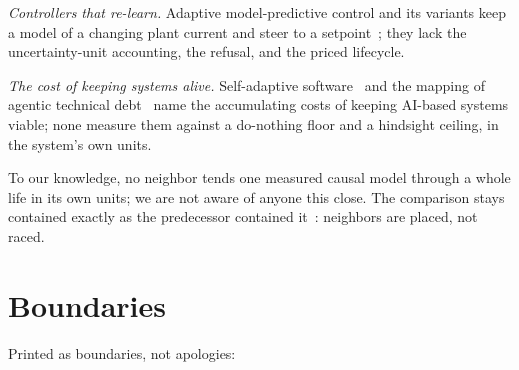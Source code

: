 \documentclass[11pt,a4paper]{article}
\begin{document}
\emph{Controllers that re-learn.} Adaptive model-predictive control
and its variants keep a model of a changing plant current and steer
to a setpoint~\cite{tanaskovic2017,knaup2024}; they lack the
uncertainty-unit accounting, the refusal, and the priced lifecycle.

\emph{The cost of keeping systems alive.} Self-adaptive
software~\cite{abufouda2014,abufouda2014b} and the mapping of
agentic technical debt~\cite{tukur2026} name the accumulating costs
of keeping AI-based systems viable; none measure them against a
do-nothing floor and a hindsight ceiling, in the system's own
units.

To our knowledge, no neighbor tends one measured causal model
through a whole life in its own units; we are not aware of anyone
this close. The comparison stays contained exactly as the
predecessor contained it~\cite{p4}: neighbors are placed, not raced.

\section{Boundaries}
\label{sec:boundaries}

Printed as boundaries, not apologies:
\end{document}

